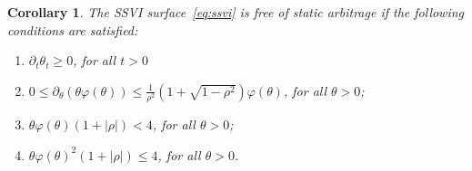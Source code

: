 \documentclass[12pt]{article}
\newtheorem{cor}{Corollary}[section]
\numberwithin{equation}{section}
\begin{document}
\begin{cor}\label{cor:NoStaticArb}
The SSVI surface~\eqref{eq:ssvi} is free of static arbitrage if the following conditions are satisfied:
\begin{enumerate}
\item $\partial_t \theta_t \geq 0$, for all $t>0$
\item $0\leq \partial_\theta (\theta \varphi(\theta))  \leq 
\frac{1}{\rho^2}\left(1+\sqrt{1-\rho^2}\right)\varphi(\theta)$, for all $\theta>0$;
\item $\theta\varphi(\theta)\left(1+|\rho|\right)< 4$, for all $\theta>0$;
\label{item:4-2}
\item $\theta\varphi(\theta)^2 \left(1+|\rho|\right)\leq 4$, for all $\theta>0$.\label{item:5-2}
\end{enumerate}
\end{cor}
\end{document}
